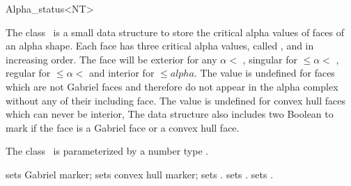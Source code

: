 

\begin{ccRefClass}{Alpha_status<NT>}  %


\ccDefinition
  
The class \ccRefName\ is a small data structure to store
the critical alpha values of faces of an alpha shape.
Each face has three critical alpha values, called
,  and  in increasing order.
The face will be exterior for any $\alpha < $ ,
singular for  $\leq  \alpha  < $ ,
regular for   $\leq  \alpha < $ 
and interior for  $ \leq alpha$.
The value  is undefined for faces which are not Gabriel
faces and therefore do not appear in the alpha complex
without any of their
including face. The value  is undefined
for convex hull faces which can never be interior,
The data structure also includes two Boolean to mark
if the face is a Gabriel face or a convex hull face.

The class \ccRefName\ is parameterized by a number type .





\ccCreation
{}  %


\ccModifiers
{} { sets Gabriel marker;}
\ccGlue
{} {sets convex hull marker;}
\ccGlue
{} {sets .}
\ccGlue
{} {sets .}
\ccGlue
{} {sets .}



\end{ccRefClass}
